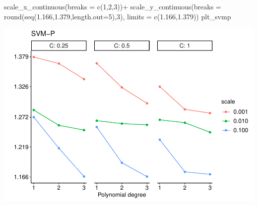 \documentclass[
]{article}
\newenvironment{Shaded}{\begin{snugshade}}{\end{snugshade}}
\newcommand{\AttributeTok}[1]{\textcolor[rgb]{0.77,0.63,0.00}{#1}}
\newcommand{\DecValTok}[1]{\textcolor[rgb]{0.00,0.00,0.81}{#1}}
\newcommand{\FloatTok}[1]{\textcolor[rgb]{0.00,0.00,0.81}{#1}}
\newcommand{\FunctionTok}[1]{\textcolor[rgb]{0.00,0.00,0.00}{#1}}
\newcommand{\NormalTok}[1]{#1}
\newcommand{\SpecialCharTok}[1]{\textcolor[rgb]{0.00,0.00,0.00}{#1}}
\begin{document}
\begin{Shaded}
\begin{Highlighting}[]
  \FunctionTok{scale\_x\_continuous}\NormalTok{(}\AttributeTok{breaks =} \FunctionTok{c}\NormalTok{(}\DecValTok{1}\NormalTok{,}\DecValTok{2}\NormalTok{,}\DecValTok{3}\NormalTok{))}\SpecialCharTok{+}
  \FunctionTok{scale\_y\_continuous}\NormalTok{(}\AttributeTok{breaks =} \FunctionTok{round}\NormalTok{(}\FunctionTok{seq}\NormalTok{(}\FloatTok{1.166}\NormalTok{,}\FloatTok{1.379}\NormalTok{,}\AttributeTok{length.out=}\DecValTok{5}\NormalTok{),}\DecValTok{3}\NormalTok{),}
                     \AttributeTok{limits =} \FunctionTok{c}\NormalTok{(}\FloatTok{1.166}\NormalTok{,}\FloatTok{1.379}\NormalTok{))}
\NormalTok{plt\_svmp}
\end{Highlighting}
\end{Shaded}

\includegraphics{sl-inf-cairs-2301_files/figure-latex/optResults-7.pdf}
\end{document}
